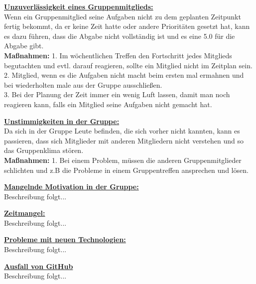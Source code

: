 \documentclass[fontsize=12pt,paper=a4,twoside]{scrartcl}
\begin{document}
\bigskip

\textbf{\underline{Unzuverlässigkeit eines Gruppenmitglieds:}}\\
Wenn ein Gruppenmitglied seine Aufgaben nicht zu dem geplanten Zeitpunkt fertig bekommt, da er keine Zeit hatte oder andere Prioritäten gesetzt hat, kann es dazu führen, dass die Abgabe nicht vollständig ist und es eine 5.0 für die Abgabe gibt.\\
\textbf{Maßnahmen:}
1. Im wöchentlichen Treffen den Fortschritt jedes Mitglieds begutachten und evtl. darauf reagieren, sollte ein Mitglied nicht im Zeitplan sein.\\
2. Mitglied, wenn es die Aufgaben nicht macht beim ersten mal ermahnen und bei wiederholten male aus der Gruppe  ausschließen.\\
3. Bei der Planung der Zeit immer ein wenig Luft lassen, damit man noch reagieren kann, falls ein Mitglied seine Aufgaben nicht gemacht hat.\\

\bigskip

\textbf{\underline{Unstimmigkeiten in der Gruppe:}}\\
Da sich in der Gruppe Leute befinden, die sich vorher nicht kannten, kann es passieren, dass sich Mitglieder mit anderen Mitgliedern nicht verstehen und so das Gruppenklima stören.\\
\textbf{Maßnahmen:}
1. Bei einem Problem, müssen die anderen Gruppenmitglieder schlichten und z.B die Probleme in einem Gruppentreffen ansprechen und lösen.\\

\bigskip 

\textbf{\underline{Mangelnde Motivation in der Gruppe:}}\\
Beschreibung folgt...\\

\bigskip

\textbf{\underline{Zeitmangel:}}\\
Beschreibung folgt...\\

\bigskip

\textbf{\underline{Probleme mit neuen Technologien:}}\\
Beschreibung folgt...\\

\bigskip

\textbf{\underline{Ausfall von GitHub}}\\
Beschreibung folgt...\\
\end{document}
